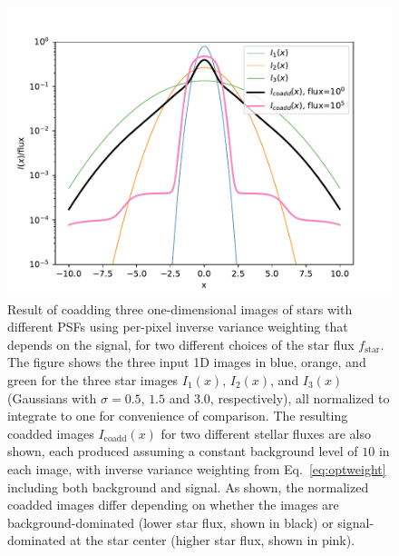\documentclass{openjournal}
\newcommand{\irresponse}[1]{{#1}}
\begin{document}
\begin{figure}
\begin{center}
\includegraphics[width=5.5in]{figures/coadd_psf.pdf}
 \caption{Result of coadding three one-dimensional images of stars with different PSFs using \irresponse{per-pixel} inverse variance weighting that \irresponse{depends on} the signal, for two different choices of the star flux $f_\text{star}$.  The figure shows the \irresponse{three input} 1D images \irresponse{in blue, orange, and green} for the three star images $I_1(x)$, $I_2(x)$, and $I_3(x)$ (Gaussians with $\sigma=0.5$, $1.5$ and $3.0$, respectively), all normalized to integrate to one for convenience of comparison. \irresponse{The resulting coadded images $I_\text{coadd}(x)$ for two different stellar fluxes are also shown, each} produced assuming a constant background level of $10$ in each image, with inverse variance weighting from Eq.~\eqref{eq:optweight} including both background and signal.  As shown, the \irresponse{normalized} coadded images differ depending on whether the images are background-dominated (lower star flux, shown in black) or signal-dominated at the star center (higher star flux, shown in pink).} \label{fig:coadd_psf}
\end{center}
 \end{figure}
 
\end{document}
